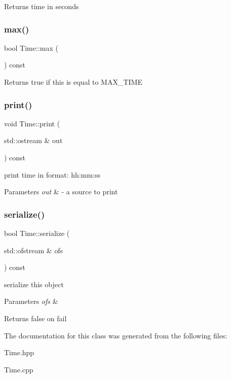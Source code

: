 \begin{DoxyReturn}{Returns}
time in seconds 
\end{DoxyReturn}
\mbox{\label{classTime_a57f85c6b8295acdcf4e2f22ce7685170}} 
\subsubsection{\texorpdfstring{max()}{max()}}
{\footnotesize\ttfamily bool Time\+::max (\begin{DoxyParamCaption}{ }\end{DoxyParamCaption}) const}

\begin{DoxyReturn}{Returns}
true if this is equal to M\+A\+X\+\_\+\+T\+I\+ME 
\end{DoxyReturn}
\mbox{\label{classTime_a2596ef53ebb188dc75b88160bd0aa230}} 
\subsubsection{\texorpdfstring{print()}{print()}}
{\footnotesize\ttfamily void Time\+::print (\begin{DoxyParamCaption}\item[{std\+::ostream \&}]{out }\end{DoxyParamCaption}) const}

print time in format\+: hh\+:mm\+:ss 
\begin{DoxyParams}{Parameters}
{\em out} & -\/ a source to print \\
\hline
\end{DoxyParams}
\mbox{\label{classTime_acab7dbc13c8a0d9a0f33047d41f4aee0}} 
\subsubsection{\texorpdfstring{serialize()}{serialize()}}
{\footnotesize\ttfamily bool Time\+::serialize (\begin{DoxyParamCaption}\item[{std\+::ofstream \&}]{ofs }\end{DoxyParamCaption}) const}

serialize this object 
\begin{DoxyParams}{Parameters}
{\em ofs} & \\
\hline
\end{DoxyParams}
\begin{DoxyReturn}{Returns}
false on fail 
\end{DoxyReturn}


The documentation for this class was generated from the following files\+:\begin{DoxyCompactItemize}
\item 
Time.\+hpp\item 
Time.\+cpp\end{DoxyCompactItemize}
